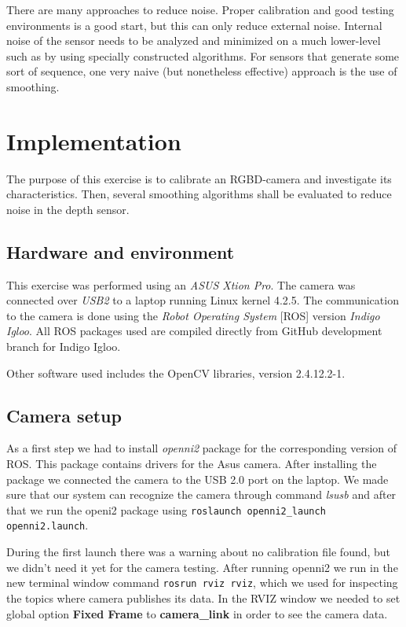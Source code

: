 \documentclass[11pt]{article}
\begin{document}
There are many approaches to reduce noise. Proper calibration and good testing environments is a good start, but this can only reduce external noise. Internal noise of the sensor needs to be analyzed and minimized on a much lower-level such as by using specially constructed algorithms. For sensors that generate some sort of sequence, one very naive (but nonetheless effective) approach is the use of smoothing. \par

\section{Implementation}
The purpose of this exercise is to calibrate an RGBD-camera and investigate its characteristics. Then, several smoothing algorithms shall be evaluated to reduce noise in the depth sensor.

\subsection{Hardware and environment}
This exercise was performed using an \emph{ASUS Xtion Pro}. The camera was connected over \emph{USB2} to a laptop running Linux kernel 4.2.5. The communication to the camera is done using the \emph{Robot Operating System} [ROS] version \emph{Indigo Igloo}. All ROS packages used are compiled directly from GitHub development branch for Indigo Igloo. \par
Other software used includes the OpenCV libraries, version 2.4.12.2-1.

\subsection{Camera setup}
As a first step we had to install \emph{openni2} package for the corresponding version of ROS. This package contains drivers for the Asus camera. After installing the package we connected the camera to the USB 2.0 port on the laptop. We made sure that our system can recognize the camera through command \emph{lsusb} and after that we run the openi2 package using \texttt{roslaunch openni2\_launch openni2.launch}. \par 
During the first launch there was a warning about no calibration file found, but we didn't need it yet for the camera testing. After running openni2 we run in the new terminal window command \texttt{rosrun rviz rviz}, which we used for inspecting the topics where camera publishes its data. In the RVIZ window we needed to set global option \textbf{Fixed Frame} to \textbf{camera\_link} in order to see the camera data. \par
\end{document}
